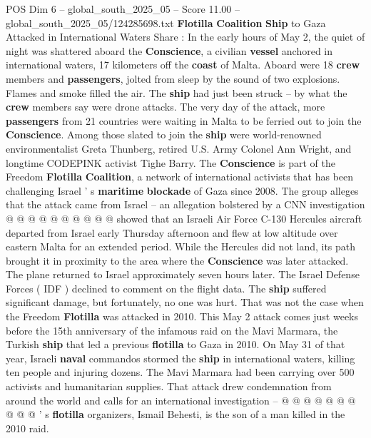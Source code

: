 \begin{textsample}{POS Dim 6 – global\_south\_2025\_05 – Score 11.00 – global\_south\_2025\_05/124285698.txt}  \label{ex:f6_pos_033}
\textbf{Flotilla} \textbf{Coalition} \textbf{Ship} to Gaza Attacked in International Waters Share : In the early hours of May 2, the quiet of night was shattered aboard the \textbf{Conscience}, a civilian \textbf{vessel} anchored in international waters, 17 kilometers off the \textbf{coast} of Malta.
Aboard were 18 \textbf{crew} members and \textbf{passengers}, jolted from sleep by the sound of two explosions.
Flames and smoke filled the air.
The \textbf{ship} had just been struck -- by what the \textbf{crew} members say were drone attacks.
The very day of the attack, more \textbf{passengers} from 21 countries were waiting in Malta to be ferried out to join the \textbf{Conscience}.
Among those slated to join the \textbf{ship} were world-renowned environmentalist Greta Thunberg, retired U.S.
Army Colonel Ann Wright, and longtime CODEPINK activist Tighe Barry.
The \textbf{Conscience} is part of the Freedom \textbf{Flotilla} \textbf{Coalition}, a network of international activists that has been challenging Israel ' s \textbf{maritime} \textbf{blockade} of Gaza since 2008.
The group alleges that the attack came from Israel -- an allegation bolstered by a CNN investigation @ @ @ @ @ @ @ @ @ @ showed that an Israeli Air Force C-130 Hercules aircraft departed from Israel early Thursday afternoon and flew at low altitude over eastern Malta for an extended period.
While the Hercules did not land, its path brought it in proximity to the area where the \textbf{Conscience} was later attacked.
The plane returned to Israel approximately seven hours later.
The Israel Defense Forces ( IDF ) declined to comment on the flight data.
The \textbf{ship} suffered significant damage, but fortunately, no one was hurt.
That was not the case when the Freedom \textbf{Flotilla} was attacked in 2010.
This May 2 attack comes just weeks before the 15th anniversary of the infamous raid on the Mavi Marmara, the Turkish \textbf{ship} that led a previous \textbf{flotilla} to Gaza in 2010.
On May 31 of that year, Israeli \textbf{naval} commandos stormed the \textbf{ship} in international waters, killing ten people and injuring dozens.
The Mavi Marmara had been carrying over 500 activists and humanitarian supplies.
That attack drew condemnation from around the world and calls for an international investigation -- @ @ @ @ @ @ @ @ @ @ ' s \textbf{flotilla} organizers, Ismail Behesti, is the son of a man killed in the 2010 raid.

\end{textsample}

